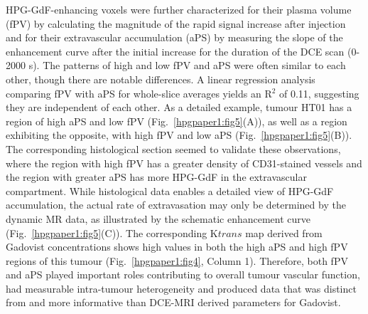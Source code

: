 HPG-GdF-enhancing voxels were further characterized for their plasma volume (fPV) by calculating the magnitude of the rapid signal increase after injection and for their extravascular accumulation (aPS) by measuring the slope of the enhancement curve after the initial increase for the duration of the DCE scan (0-2000 s).
The patterns of high and low \ac{fPV} and \ac{aPS} were often similar to each other, though there are notable differences.
A linear regression analysis comparing \ac{fPV} with \ac{aPS} for whole-slice averages yields an R$^2$ of 0.11, suggesting they are independent of each other.
As a detailed example, tumour HT01 has a region of high \ac{aPS} and low \ac{fPV} (Fig.~\ref{hpgpaper1:fig5}(A)), as well as a region exhibiting the opposite, with high \ac{fPV} and low \ac{aPS} (Fig.~\ref{hpgpaper1:fig5}(B)).
The corresponding histological section seemed to validate these observations, where the region with high \ac{fPV} has a greater density of CD31-stained vessels and the region with greater \ac{aPS} has more \ac{HPG-GdF} in the extravascular compartment.
While histological data enables a detailed view of \ac{HPG-GdF} accumulation, the actual rate of extravasation may only be determined by the dynamic MR data, as illustrated by the schematic enhancement curve (Fig.~\ref{hpgpaper1:fig5}(C)).
The corresponding K${trans}$ map derived from Gadovist concentrations shows high values in both the high \ac{aPS} and high \ac{fPV} regions of this tumour (Fig.~\ref{hpgpaper1:fig4}, Column 1).
Therefore, both \ac{fPV} and \ac{aPS} played important roles contributing to overall tumour vascular function, had measurable intra-tumour heterogeneity and produced data that was distinct from and more informative than DCE-MRI derived parameters for Gadovist.

